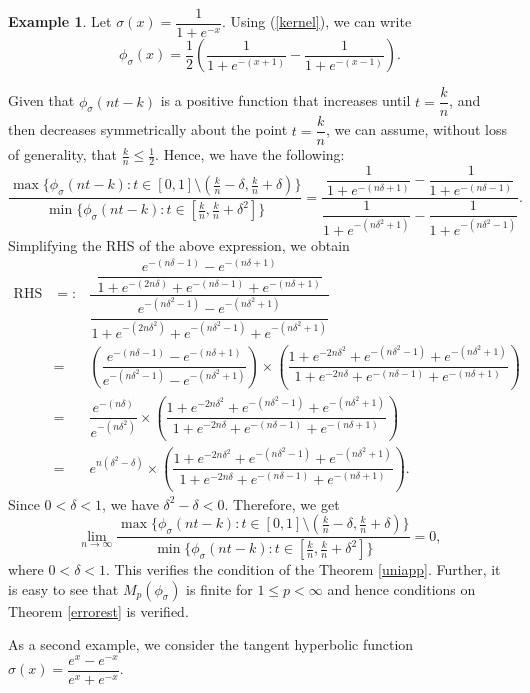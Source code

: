\documentclass[12pt, reqno]{amsart}
\numberwithin{equation}{section}
\theoremstyle{definition}
\newtheorem{example}[theorem]{Example}
\theoremstyle{remark}
\numberwithin{equation}{section}
\begin{document}
\begin{example}
    
\label{elogis}
    Let $\sigma(x)=\dfrac{1}{1+e^{-x}}.$ Using (\ref{kernel}), we can write  
    $$\phi_\sigma(x)=\dfrac{1}{2}\left(\dfrac{1}{1+e^{-(x+1)}}-\dfrac{1}{1+e^{-(x-1)}}\right).$$ 
    
    Given that $\phi_\sigma(nt-k)$ is a positive function that increases until $t=\dfrac{k}{n}$, and then decreases symmetrically about the point $t=\dfrac{k}{n}$, we can assume, without loss of generality,  that $\frac{k}{n}\leq\frac{1}{2}.$ Hence, we have the following: 
\[\dfrac{\max\{\phi_\sigma(nt-k): t\in [0,1] \setminus(\frac{k}{n}-\delta, \frac{k}{n}+\delta) \}}{\min\{\phi_\sigma(nt-k): t\in[\frac{k}{n}, \frac{k}{n}+\delta^2]\}}= \dfrac{\dfrac{1}{1+e^{-(n\delta+1)}}-\dfrac{1}{1+e^{-(n\delta-1)}}} {\dfrac{1}{1+e^{-(n\delta^2+1)}}-\dfrac{1}{1+e^{-(n\delta^2-1)}}}.\]
 Simplifying the RHS of the above expression, we obtain
\begin{eqnarray*}
\text{RHS}&=:& \dfrac{\dfrac{e^{-(n\delta-1)}-e^{-(n\delta+1)}}{1+e^{-(2n\delta)}+e^{-(n\delta-1)}+e^{-(n\delta+1)}}}{\dfrac{e^{-(n\delta^2-1)}-e^{-(n\delta^2+1)}}{1+e^{-(2n\delta^2)}+e^{-(n\delta^2-1)}+e^{-(n\delta^2+1)}}} \\
&=& \left(\dfrac{e^{-(n\delta-1)}-e^{-(n\delta+1)}}{e^{-(n\delta^2-1)}-e^{-(n\delta^2+1)}}\right) \times  \left(\dfrac{1+e^{-2n\delta^2}+e^{-(n\delta^2-1)}+e^{-(n\delta^2+1)}}{1+e^{-2n\delta}+e^{-(n\delta-1)}+e^{-(n\delta+1)}}\right) \\
&=& \dfrac{e^{-(n\delta)}}{e^{-(n\delta^2)}}\times \left(\dfrac{1+e^{-2n\delta^2}+e^{-(n\delta^2-1)}+e^{-(n\delta^2+1)}}{1+e^{-2n\delta}+e^{-(n\delta-1)}+e^{-(n\delta+1)}}\right) \\
&=& e^{n(\delta^2-\delta)} \times \left(\dfrac{1+e^{-2n\delta^2}+e^{-(n\delta^2-1)}+e^{-(n\delta^2+1)}}{1+e^{-2n\delta}+e^{-(n\delta-1)}+e^{-(n\delta+1)}}\right).
\end{eqnarray*}
Since $0<\delta<1$, we have $\delta^2-\delta<0.$ Therefore, we get 
\[
    \lim_{n\to\infty}\dfrac{\max\{\phi_\sigma(nt-k): t\in  [0,1]\setminus (\frac{k}{n}-\delta, \frac{k}{n}+\delta) \}}{\min\{\phi_\sigma(nt-k): t\in[\frac{k}{n}, \frac{k}{n}+\delta^2]\}}=0,\] where $0<\delta<1.$ This verifies the condition of the Theorem \ref{uniapp}. Further, it is easy to see that $M_p(\phi_\sigma)$ is finite for $1\leq p<\infty$ and hence conditions on Theorem \ref{errorest} is verified.
\end{example}

As a second example, we consider the tangent hyperbolic function 
$\sigma(x)=\dfrac{e^x - e^{-x}}{e^x + e^{-x}}.$ 
\end{document}
